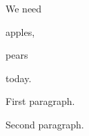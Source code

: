 \documentclass{article}
\begin{document}
We need \begin{inparablank}\item apples, \item pears\end{inparablank} today.
\begin{asparablank}
\item First paragraph.
\item Second paragraph.
\end{asparablank}
\end{document}
